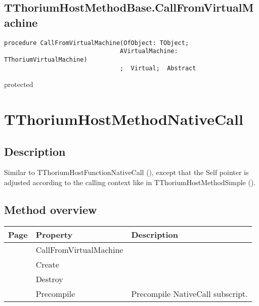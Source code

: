 \subsection{TThoriumHostMethodBase.CallFromVirtualMachine}
\label{thoriumcorepkg:thorium:tthoriumhostmethodbase:callfromvirtualmachine}
\begin{FPCList}
\Declaration 

\begin{verbatim}
procedure CallFromVirtualMachine(OfObject: TObject;
                                AVirtualMachine: TThoriumVirtualMachine)
                                ;  Virtual;  Abstract
\end{verbatim}
\Visibility
protected
\end{FPCList}
\section{TThoriumHostMethodNativeCall}
\label{thoriumcorepkg:thorium:tthoriumhostmethodnativecall}
\subsection{Description}
Similar to TThoriumHostFunctionNativeCall (\pageref{thoriumcorepkg:thorium:tthoriumhostfunctionnativecall}), except that the Self pointer is adjusted according to the calling context like in TThoriumHostMethodSimple (\pageref{thoriumcorepkg:thorium:tthoriumhostmethodsimple}).%
\subsection{Method overview}
\label{thoriumcorepkg:thorium:tthoriumhostmethodnativecall:methods}
\begin{tabularx}{\textwidth}{llX}
Page & Property & Description  \\ \hline
\pageref{thoriumcorepkg:thorium:tthoriumhostmethodnativecall:callfromvirtualmachine} & CallFromVirtualMachine  &  \\
\pageref{thoriumcorepkg:thorium:tthoriumhostmethodnativecall:create} & Create  &  \\
\pageref{thoriumcorepkg:thorium:tthoriumhostmethodnativecall:destroy} & Destroy  &  \\
\pageref{thoriumcorepkg:thorium:tthoriumhostmethodnativecall:precompile} & Precompile  & Precompile NativeCall subscript. \\
\hline
\end{tabularx}
